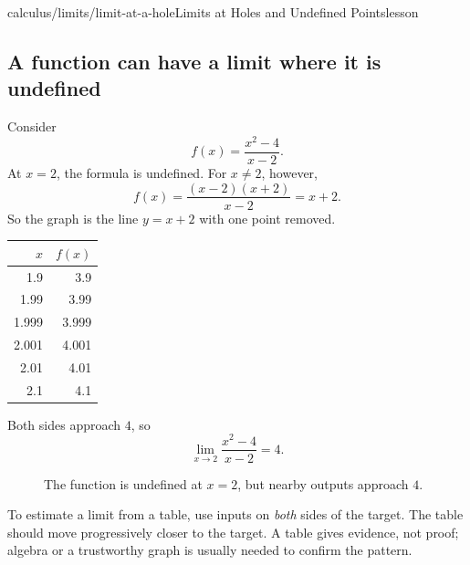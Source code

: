 \begin{webpage}{calculus/limits/limit-at-a-hole}{Limits at Holes and Undefined Points}{lesson}
\subsection{A function can have a limit where it is undefined}

Consider
\[
  f(x)=\frac{x^2-4}{x-2}.
\]
At \(x=2\), the formula is undefined. For \(x\ne2\), however,
\[
  f(x)=\frac{(x-2)(x+2)}{x-2}=x+2.
\]
So the graph is the line \(y=x+2\) with one point removed.

\begin{center}
\begin{tabular}{@{}r r@{}}
\toprule
\(x\) & \(f(x)\)\\
\midrule
1.9 & 3.9\\
1.99 & 3.99\\
1.999 & 3.999\\
2.001 & 4.001\\
2.01 & 4.01\\
2.1 & 4.1\\
\bottomrule
\end{tabular}
\end{center}

Both sides approach \(4\), so
\[
  \boxed{\lim_{x\to2}\frac{x^2-4}{x-2}=4}.
\]

\begin{figure}[htbp]
\centering
{}
\caption{The function is undefined at \(x=2\), but nearby outputs approach \(4\).}
\label{fig:hole}
\end{figure}

\begin{bgmethod}
To estimate a limit from a table, use inputs on \emph{both} sides of the target. The table should move progressively closer to the target. A table gives evidence, not proof; algebra or a trustworthy graph is usually needed to confirm the pattern.
\end{bgmethod}


\end{webpage}

